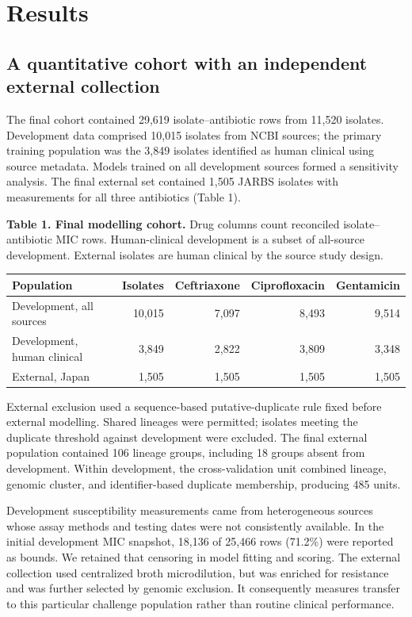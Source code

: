 \documentclass[
  american,
  11pt,
]{article}
\newcounter{none} %
\begin{document}
\section{Results}\label{results}

\subsection{A quantitative cohort with an independent external
collection}\label{a-quantitative-cohort-with-an-independent-external-collection}

The final cohort contained 29,619 isolate--antibiotic rows from 11,520
isolates. Development data comprised 10,015 isolates from NCBI sources;
the primary training population was the 3,849 isolates identified as
human clinical using source metadata. Models trained on all development
sources formed a sensitivity analysis. The final external set contained
1,505 JARBS isolates with measurements for all three antibiotics (Table
1).

\textbf{Table 1. Final modelling cohort.} Drug columns count reconciled
isolate--antibiotic MIC rows. Human-clinical development is a subset of
all-source development. External isolates are human clinical by the
source study design.

{\def\LTcaptype{none} %
\begin{longtable}[]{@{}lrrrr@{}}
\toprule\noalign{}
Population & Isolates & Ceftriaxone & Ciprofloxacin & Gentamicin \\
\midrule\noalign{}
\endhead
\bottomrule\noalign{}
\endlastfoot
Development, all sources & 10,015 & 7,097 & 8,493 & 9,514 \\
Development, human clinical & 3,849 & 2,822 & 3,809 & 3,348 \\
External, Japan & 1,505 & 1,505 & 1,505 & 1,505 \\
\end{longtable}
}

External exclusion used a sequence-based putative-duplicate rule fixed
before external modelling. Shared lineages were permitted; isolates
meeting the duplicate threshold against development were excluded. The
final external population contained 106 lineage groups, including 18
groups absent from development. Within development, the cross-validation
unit combined lineage, genomic cluster, and identifier-based duplicate
membership, producing 485 units.

Development susceptibility measurements came from heterogeneous sources
whose assay methods and testing dates were not consistently available.
In the initial development MIC snapshot, 18,136 of 25,466 rows (71.2\%)
were reported as bounds. We retained that censoring in model fitting and
scoring. The external collection used centralized broth microdilution,
but was enriched for resistance and was further selected by genomic
exclusion. It consequently measures transfer to this particular
challenge population rather than routine clinical performance.
\end{document}
